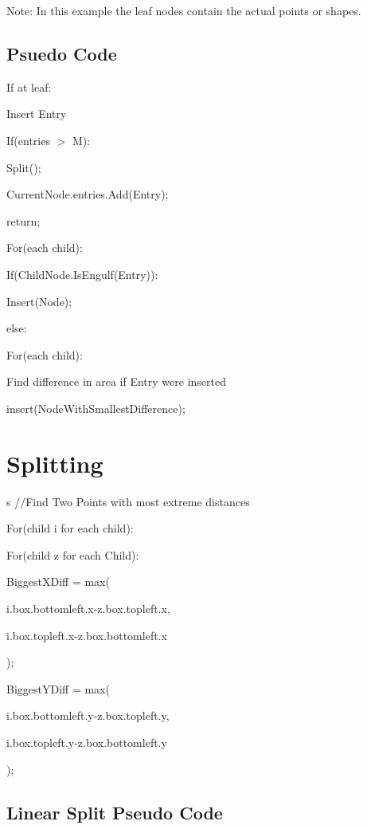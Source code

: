 \documentclass{article}
\begin{document}
Note: In this example the leaf nodes contain the actual points or shapes.
\subsection*{Psuedo Code}
\begin{flushleft}
    
If at leaf:

\quad Insert Entry

\quad If(entries $>$ M):

\quad \quad Split();

\quad CurrentNode.entries.Add(Entry);

\quad return;


For(each child):


\quad If(ChildNode.IsEngulf(Entry)):

 \quad \quad Insert(Node);


else:

\quad For(each child):

    \quad \quad
    Find difference in area if Entry were inserted

    \quad insert(NodeWithSmallestDifference);
\end{flushleft}

\section{Splitting} 
\begin{flushleft}s
//Find Two Points with most extreme distances

For(child i for each child):

\quad For(child z for each Child):

    \quad \quad BiggestXDiff = max(

    \quad \quad \quad     i.box.bottomleft.x-z.box.topleft.x,

    \quad \quad \quad     i.box.topleft.x-z.box.bottomleft.x

    \quad \quad     );

    \quad \quad BiggestYDiff = max(

    \quad \quad \quad     i.box.bottomleft.y-z.box.topleft.y,

    \quad \quad \quad     i.box.topleft.y-z.box.bottomleft.y

    \quad \quad     );

    \quad\quad 

\subsection*{Linear Split Pseudo Code}



\end{flushleft}
\end{document}
